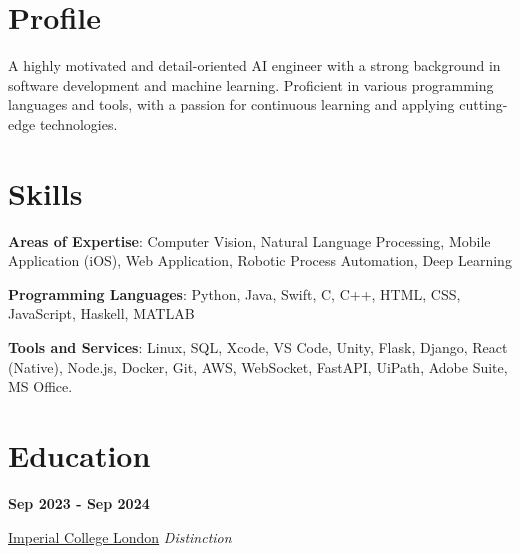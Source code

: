 \documentclass[9pt,a4paper]{article} %
\begin{document}
\begin{multicols}{2}


\section{Profile}
A highly motivated and detail-oriented AI engineer with a strong background in software development and machine learning. Proficient in various programming languages and tools, with a passion for continuous learning and applying cutting-edge technologies.


\section{Skills}

\textbf{Areas of Expertise}: Computer Vision, Natural Language Processing, Mobile Application (iOS), Web Application, Robotic Process Automation, Deep Learning
\vspace{2mm}

\textbf{Programming Languages}: Python, Java, Swift, C, C++, HTML, CSS, JavaScript, Haskell, MATLAB
\vspace{2mm}

\textbf{Tools and Services}: Linux, SQL, Xcode, VS Code, Unity, Flask, Django, React (Native), Node.js, Docker, Git, AWS, WebSocket, FastAPI, UiPath, Adobe Suite, MS Office.


\section{Education}

\textbf{Sep 2023 - Sep 2024}

\href{https://www.imperial.ac.uk}{Imperial College London} \hfill \textit{Distinction}


\end{multicols}
\end{document}
